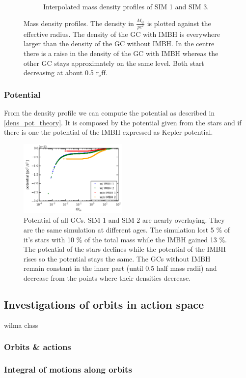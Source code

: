 \begin{figure}
\begin{subfigure}{0.475\textwidth}
		\caption{Interpolated mass density profiles of SIM 1 and SIM 3.}
		\label{mass_dens_intpol}
	\end{subfigure}
	\caption{Mass density profiles. The density in \(\frac{M_{\odot}}{pc^2}\) is plotted against the effective radius. The density of the \ac{GC} with \ac{IMBH} is everywhere larger than the density of the \ac{GC} without \ac{IMBH}. In the centre there is a raise in the density of the \ac{GC} with \ac{IMBH} whereas the other \ac{GC} stays approximately on the same level. Both start decreasing at about 0.5 \(\mathrm{r_eff}\).}
	\label{fig:mass_density_profile}
\end{figure}

\subsubsection{Potential}
From the density profile we can compute the potential as described in \ref{dens_pot_theory}. It is composed by the potential given from the stars and if there is one the potential of the \ac{IMBH} expressed as Kepler potential.
\begin{figure}
	\centering
	\includegraphics[width=0.475\textwidth]{Plots/Pot.pdf}
	\caption{Potential of all \acp{GC}. SIM 1 and SIM 2 are nearly overlaying. They are the same simulation at different ages. The simulation lost 5 \% of it's stars with 10 \% of the total mass while the \ac{IMBH} gained 13 \%. The potential of the stars declines while the potential of the \ac{IMBH} rises so the potential stays the same. The \acp{GC} without \ac{IMBH} remain constant in the inner part (until 0.5 half mass radii) and decrease from the points where their densities decrease.}
\end{figure}


\subsection{Investigations of orbits in action space}
wilma class 
\subsubsection{Orbits \& actions}

\subsubsection{Integral of motions along orbits}
